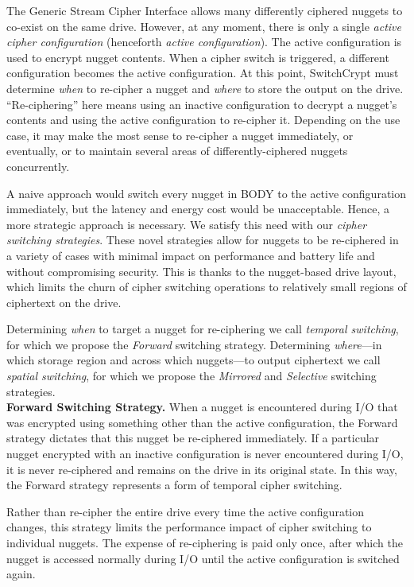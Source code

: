 The Generic Stream Cipher Interface allows many differently ciphered nuggets to
co-exist on the same drive. However, at any moment, there is only a single
\emph{active cipher configuration} (henceforth \emph{active configuration}). The
active configuration is used to encrypt nugget contents. When a cipher switch is
triggered, a different configuration becomes the active configuration. At this
point, SwitchCrypt must determine \emph{when} to re-cipher a nugget and
\emph{where} to store the output on the drive. ``Re-ciphering'' here means using
an inactive configuration to decrypt a nugget's contents and using the active
configuration to re-cipher it. Depending on the use case, it may make the most
sense to re-cipher a nugget immediately, or eventually, or to maintain several
areas of differently-ciphered nuggets concurrently.

A naive approach would switch every nugget in BODY to the active configuration
immediately, but the latency and energy cost would be unacceptable. Hence, a
more strategic approach is necessary. We satisfy this need with our \emph{cipher
switching strategies}. These novel strategies allow for nuggets to be
re-ciphered in a variety of cases with minimal impact on performance and battery
life and without compromising security. This is thanks to the nugget-based drive
layout, which limits the churn of cipher switching operations to relatively
small regions of ciphertext on the drive.

Determining \emph{when} to target a nugget for re-ciphering we call
\emph{temporal switching}, for which we propose the \emph{Forward} switching
strategy. Determining \emph{where}---in which storage region and across which
nuggets---to output ciphertext we call \emph{spatial switching}, for which we
propose the \emph{Mirrored} and \emph{Selective} switching strategies. \\

\textbf{Forward Switching Strategy.} When a nugget is encountered during I/O
that was encrypted using something other than the active configuration, the
Forward strategy dictates that this nugget be re-ciphered immediately. If a
particular nugget encrypted with an inactive configuration is never encountered
during I/O, it is never re-ciphered and remains on the drive in its original
state. In this way, the Forward strategy represents a form of temporal cipher
switching.

Rather than re-cipher the entire drive every time the active configuration
changes, this strategy limits the performance impact of cipher switching to
individual nuggets. The expense of re-ciphering is paid only once, after which
the nugget is accessed normally during I/O until the active configuration is
switched again.

